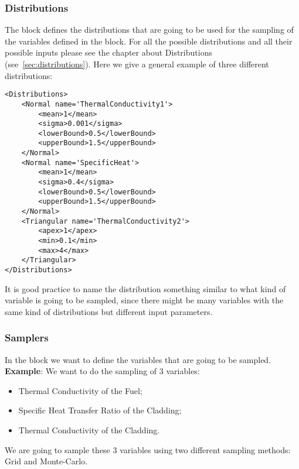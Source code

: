 \subsubsection{Distributions}
The  block defines the distributions that are going
to be used for the sampling of the variables defined in the 
block.
%
For all the possible distributions and all their possible inputs please see the
chapter about Distributions (see~\ref{sec:distributions}).
%
Here we give a general example of three different distributions:
\begin{lstlisting}[style=XML,morekeywords={name,debug}]
<Distributions>
    <Normal name='ThermalConductivity1'>
        <mean>1</mean>
        <sigma>0.001</sigma>
        <lowerBound>0.5</lowerBound>
        <upperBound>1.5</upperBound>
    </Normal>
    <Normal name='SpecificHeat'>
        <mean>1</mean>
        <sigma>0.4</sigma>
        <lowerBound>0.5</lowerBound>
        <upperBound>1.5</upperBound>
    </Normal>
    <Triangular name='ThermalConductivity2'>
        <apex>1</apex>
        <min>0.1</min>
        <max>4</max>
    </Triangular>
</Distributions>
\end{lstlisting}

It is good practice to name the distribution something similar to what kind of
variable is going to be sampled, since there might be many variables with the
same kind of distributions but different input parameters.
%
\subsubsection{Samplers}
In the  block we want to define the variables that are going
to be sampled.
%
\textbf{Example}:
We want to do the sampling of 3 variables:
\begin{itemize}
  \item Thermal Conductivity of the Fuel;
  \item Specific Heat Transfer Ratio of the Cladding;
  \item Thermal Conductivity of the Cladding.
\end{itemize}

We are going to sample these 3 variables using two different sampling methods:
Grid and Monte-Carlo.

